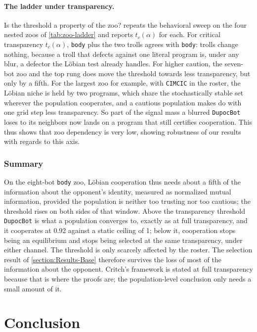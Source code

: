 \documentclass[twoside,11pt]{article}
\begin{document}
\paragraph{The ladder under transparency.}
Is the threshold a property of the zoo?  repeats the behavioral sweep on the four nested zoos of \cref{tab:zoo-ladder} and reports $t_c(\alpha)$ for each. For critical transparency $t_c(\alpha)$, \texttt{body} plus the two trolls agrees with \texttt{body}: trolls change nothing, because a troll that defects against one literal program is, under any blur, a defector the Löbian test already handles. For higher caution, the seven-bot zoo and the top rung does move the threshold towards less transparency, but only by a fifth. For the largest zoo for example, with \texttt{CIMCIC} in the roster, the Löbian niche is held by two programs, which share the stochastically stable set wherever the population cooperates, and a cautious population makes do with one grid step less transparency. So part of the signal mass a blurred \texttt{DupocBot} loses to its neighbors now lands on a program that still certifies cooperation. This thus shows that zoo dependency is very low, showing robustness of our results with regards to this axis.

\subsubsection{Summary}
On the eight-bot \texttt{body} zoo, Löbian cooperation thus needs about a fifth of the information about the opponent's identity, measured as normalized mutual information, provided the population is neither too trusting nor too cautious; the threshold rises on both sides of that window. Above the transparency threshold \texttt{DupocBot} is what a population converges to, exactly as at full transparency, and it cooperates at 0.92 against a static ceiling of 1; below it, cooperation stops being an equilibrium and stops being selected at the same transparency, under either channel. The threshold is only scarcely affected by the roster. The selection result of \cref{section:Results-Base} therefore survives the loss of most of the information about the opponent. Critch's framework is stated at full transparency because that is where the proofs are; the population-level conclusion only needs a small amount of it.

\section{Conclusion}
\label{Conclusion}
\end{document}
